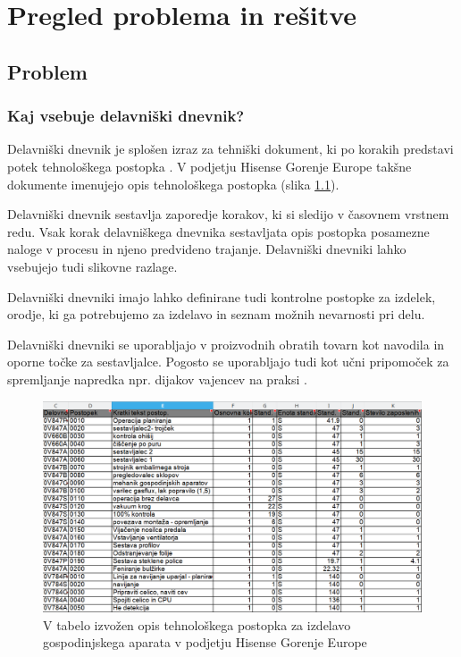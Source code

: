 \documentclass[a4paper, 12pt]{book}
\begin{document}
\chapter{Pregled problema in rešitve}

\section{Problem}

\subsection {Kaj vsebuje delavniški dnevnik?}

Delavniški dnevnik je splošen izraz za tehniški dokument, ki po korakih predstavi potek tehnološkega postopka \cite{delavniskidnevnikptuj}.
V podjetju Hisense Gorenje Europe takšne dokumente imenujejo opis tehnološkega postopka (slika \ref{sap_2}).

Delavniški dnevnik sestavlja zaporedje korakov, ki si sledijo v časovnem vrstnem redu.
Vsak korak delavniškega dnevnika sestavljata opis postopka posamezne naloge v procesu in njeno predvideno trajanje.
Delavniški dnevniki lahko vsebujejo tudi slikovne razlage.

Delavniški dnevniki imajo lahko definirane tudi kontrolne postopke za izdelek, orodje, ki ga potrebujemo za izdelavo in seznam možnih nevarnosti pri delu.

Delavniški dnevniki se uporabljajo v proizvodnih obratih tovarn kot navodila in oporne točke za sestavljalce.
Pogosto se uporabljajo tudi kot učni pripomoček za spremljanje napredka npr. dijakov vajencev na praksi \cite{delavniskidnevnikptuj, ddsclj}.

\begin{figure}[H]
\begin{center}
\includegraphics[width=13.5cm]{sap_2}
\end{center}
\caption{V tabelo izvožen opis tehnološkega postopka za izdelavo gospodinjskega aparata v podjetju Hisense Gorenje Europe}
\label{sap_2}
\end{figure}
\end{document}
